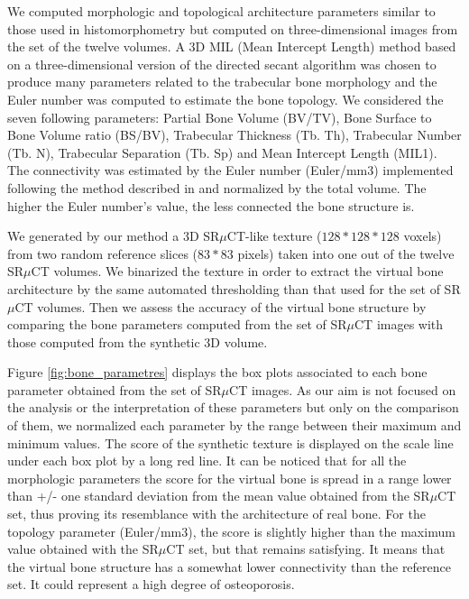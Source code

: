 We computed morphologic and topological architecture parameters similar to those used in histomorphometry 
but computed on three-dimensional images from the set of the twelve volumes. 
A 3D MIL (Mean Intercept Length) method based on a three-dimensional version of the directed 
secant algorithm was chosen to produce many parameters related to the trabecular 
bone morphology \cite{Hipp97} and the Euler number was computed to estimate the bone topology. 
We considered the seven following parameters: Partial Bone Volume (BV/TV), Bone Surface to 
Bone Volume ratio (BS/BV), Trabecular Thickness (Tb. Th), Trabecular Number (Tb. N), 
Trabecular Separation (Tb. Sp) and Mean Intercept Length (MIL1). The connectivity was estimated by the Euler number 
(Euler/mm3) implemented following the method described in 
\cite{Odgaard93} and normalized by the total volume. 
The higher the Euler number's value, the less connected the bone structure is.

We generated by our method a 3D SR$\mu$CT-like texture ($128 * 128 * 128$ voxels) from two random 
reference slices ($83 * 83$ pixels) taken into one out of the twelve SR$\mu$CT volumes.  
We binarized the texture in order to extract the virtual bone architecture by the same automated 
thresholding than that used for the set of SR$\mu$CT volumes. 
Then we assess the accuracy of the virtual bone structure by comparing the bone parameters computed 
from the set of SR$\mu$CT images with those computed from the synthetic 3D volume.

Figure \ref{fig:bone_parametres} displays the box plots associated to each bone parameter obtained 
from the set of SR$\mu$CT images. As our aim is not focused on the analysis or 
the interpretation of these parameters but only on the comparison of them, 
we normalized each parameter by the range between their maximum and minimum values. 
The score of the synthetic texture is displayed on the scale line under each box plot by a 
long red line. It can be noticed that for all the morphologic parameters the score for the 
virtual bone is spread in a range lower than +/- one standard deviation from the mean 
value obtained from the SR$\mu$CT set, thus proving its resemblance with the architecture of real bone. 
For the topology parameter (Euler/mm3), the score is slightly higher than the maximum value 
obtained with the SR$\mu$CT set, but that remains satisfying. It means that the virtual bone 
structure has a somewhat lower connectivity than the reference set. It could represent a high degree of osteoporosis.  

